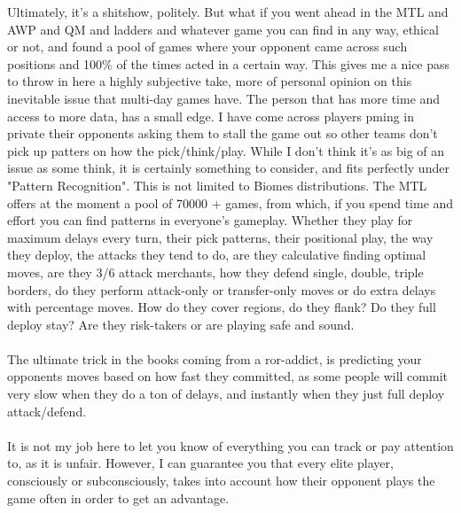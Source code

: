 Ultimately, it's a shitshow, politely. But what if you went ahead in the MTL and AWP and QM and ladders and whatever game you can find in any way, ethical or not, and found a pool of games where your opponent came across such positions and 100\% of the times acted in a certain way. This gives me a nice pass to throw in here a highly subjective take, more of personal opinion on this inevitable issue that multi-day games have. The person that has more time and access to more data, has a small edge. I have come across players pming in private their opponents asking them to stall the game out so other teams don't pick up patters on how the pick/think/play. While I don't think it's as big of an issue as some think, it is certainly something to consider, and fits perfectly under "Pattern Recognition". This is not limited to Biomes distributions. The MTL offers at the moment a pool of 70000 + games, from which, if you spend time and effort you can find patterns in everyone's gameplay. Whether they play for maximum delays every turn, their pick patterns, their positional play, the way they deploy, the attacks they tend to do, are they calculative finding optimal moves, are they 3/6 attack merchants, how they defend single, double, triple borders, do they perform attack-only or transfer-only moves or do extra delays with percentage moves. How do they cover regions, do they flank? Do they full deploy stay? Are they risk-takers or are playing safe and sound. 
\\
\\
The ultimate trick in the books coming from a ror-addict, is predicting your opponents moves based on how fast they committed, as some people will commit very slow when they do a ton of delays, and instantly when they just full deploy attack/defend.
\\
\\
It is not my job here to let you know of everything you can track or pay attention to, as it is unfair. However, I can guarantee you that every elite player, consciously or subconsciously, takes into account how their opponent plays the game often in order to get an advantage.